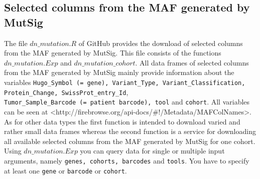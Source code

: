 \documentclass{TechReport}
\begin{document}
 
 


\subsection{Selected columns from the MAF generated by MutSig}
The file $dn\_mutation.R$ of GitHub provides the download of selected columns from
the MAF generated by MutSig. This file consists of the functions 
$dn\_mutation.Exp$ and $dn\_mutation\_cohort$. All data frames of selected columns 
from the MAF generated by MutSig mainly provide information about the variables {\tt  Hugo\_Symbol
(= gene), Variant\_Type, Variant\_Classification, Protein\_Change, SwissProt\_entry\_Id}, \\
{\tt Tumor\_Sample\_Barcode (= patient barcode), tool} and {\tt cohort}. All variables can be seen at 
<http://firebrowse.org/api-docs/\#!/Metadata/MAFColNames>.\\
As for other data types the first
function is intended to download varied and rather small data frames 
whereas the second function is a service for downloading all available selected
columns from the MAF generated by MutSig for one cohort.\\
Using $dn\_mutation.Exp$ you can query data for single or multiple input arguments,
namely {\tt genes, cohorts, barcodes} and {\tt tools}. You 
have to specify at least one {\tt gene} or {\tt barcode} or {\tt cohort}.
\end{document}
